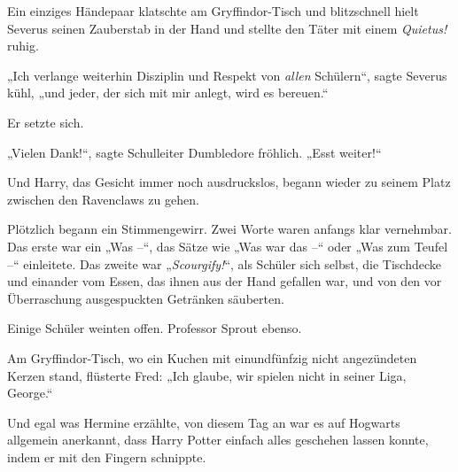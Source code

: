 Ein einziges Händepaar klatschte am Gryffindor-Tisch und blitzschnell hielt Severus seinen Zauberstab in der Hand und stellte den Täter mit einem \emph{Quietus!} ruhig.

„Ich verlange weiterhin Disziplin und Respekt von \emph{allen} Schülern“, sagte Severus kühl, „und jeder, der sich mit mir anlegt, wird es bereuen.“

Er setzte sich.

„Vielen Dank!“, sagte Schulleiter Dumbledore fröhlich. „Esst weiter!“

Und Harry, das Gesicht immer noch ausdruckslos, begann wieder zu seinem Platz zwischen den Ravenclaws zu gehen.

Plötzlich begann ein Stimmengewirr. Zwei Worte waren anfangs klar vernehmbar. Das erste war ein „Was –“, das Sätze wie „Was war das –“ oder „Was zum Teufel –“ einleitete. Das zweite war „\emph{Scourgify!}“, als Schüler sich selbst, die Tischdecke und einander vom Essen, das ihnen aus der Hand gefallen war, und von den vor Überraschung ausgespuckten Getränken säuberten.

Einige Schüler weinten offen. Professor Sprout ebenso.

Am Gryffindor-Tisch, wo ein Kuchen mit einundfünfzig nicht angezündeten Kerzen stand, flüsterte Fred: „Ich glaube, wir spielen nicht in seiner Liga, George.“

Und egal was Hermine erzählte, von diesem Tag an war es auf Hogwarts allgemein anerkannt, dass Harry Potter einfach alles geschehen lassen konnte, indem er mit den Fingern schnippte.

